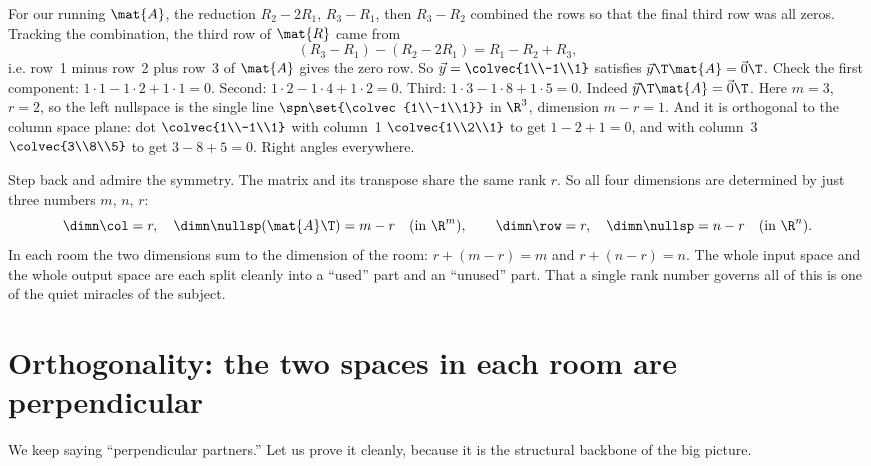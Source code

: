 \begin{example}\label{ch15:leftnull}
For our running $\mat{A}$, the reduction $R_2-2R_1$, $R_3-R_1$, then $R_3-R_2$ combined the rows
so that the final third row was all zeros. Tracking the combination, the third row of $\mat{R}$
came from
\[
  (R_3 - R_1) - (R_2 - 2R_1) = R_1 - R_2 + R_3,
\]
i.e. row~1 minus row~2 plus row~3 of $\mat{A}$ gives the zero row. So
$\vec{y}=\colvec{1\\-1\\1}$ satisfies $\vec{y}\T\mat{A}=\vec{0}\T$. Check the first component:
$1\cdot1 - 1\cdot2 + 1\cdot1 = 0$. Second: $1\cdot2-1\cdot4+1\cdot2=0$. Third:
$1\cdot3-1\cdot8+1\cdot5=0$. Indeed $\vec{y}\T\mat{A}=\vec{0}\T$. Here $m=3$, $r=2$, so the left
nullspace is the single line $\spn\set{\colvec{1\\-1\\1}}$ in $\R^3$, dimension $m-r=1$. And it is
orthogonal to the column space plane: dot $\colvec{1\\-1\\1}$ with column~1 $\colvec{1\\2\\1}$ to
get $1-2+1=0$, and with column~3 $\colvec{3\\8\\5}$ to get $3-8+5=0$. Right angles everywhere.
\end{example}

\begin{aestheticbox}
Step back and admire the symmetry. The matrix and its transpose share the same rank $r$. So all
four dimensions are determined by just three numbers $m$, $n$, $r$:
\[
  \dimn\col=r,\quad \dimn\nullsp(\mat{A}\T)=m-r \quad(\text{in }\R^m),\qquad
  \dimn\row=r,\quad \dimn\nullsp=n-r \quad(\text{in }\R^n).
\]
In each room the two dimensions sum to the dimension of the room: $r+(m-r)=m$ and $r+(n-r)=n$.
The whole input space and the whole output space are each split cleanly into a ``used'' part and
an ``unused'' part. That a single rank number governs all of this is one of the quiet miracles of
the subject.
\end{aestheticbox}

\section{Orthogonality: the two spaces in each room are perpendicular}

We keep saying ``perpendicular partners.'' Let us prove it cleanly, because it is the structural
backbone of the big picture.

